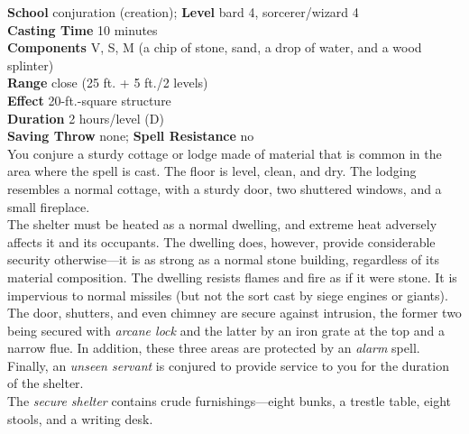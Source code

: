 \textbf{School} conjuration (creation); \textbf{Level} bard 4, sorcerer/wizard 4\\
\textbf{Casting Time} 10 minutes\\
\textbf{Components} V, S, M (a chip of stone, sand, a drop of water, and a wood splinter)\\
\textbf{Range} close (25 ft. + 5 ft./2 levels)\\
\textbf{Effect} 20-ft.-square structure\\
\textbf{Duration} 2 hours/level (D)\\
\textbf{Saving Throw} none; \textbf{Spell Resistance} no\\
You conjure a sturdy cottage or lodge made of material that is common in the area where the spell is cast. The floor is level, clean, and dry. The lodging resembles a normal cottage, with a sturdy door, two shuttered windows, and a small fireplace.\\
The shelter must be heated as a normal dwelling, and extreme heat adversely affects it and its occupants. The dwelling does, however, provide considerable security otherwise---it is as strong as a normal stone building, regardless of its material composition. The dwelling resists flames and fire as if it were stone. It is impervious to normal missiles (but not the sort cast by siege engines or giants).\\
The door, shutters, and even chimney are secure against intrusion, the former two being secured with \textit{arcane lock }and the latter by an iron grate at the top and a narrow flue. In addition, these three areas are protected by an \textit{alarm }spell. Finally, an \textit{unseen servant }is conjured to provide service to you for the duration of the shelter.\\
The \textit{secure shelter }contains crude furnishings---eight bunks, a trestle table, eight stools, and a writing desk.\\
